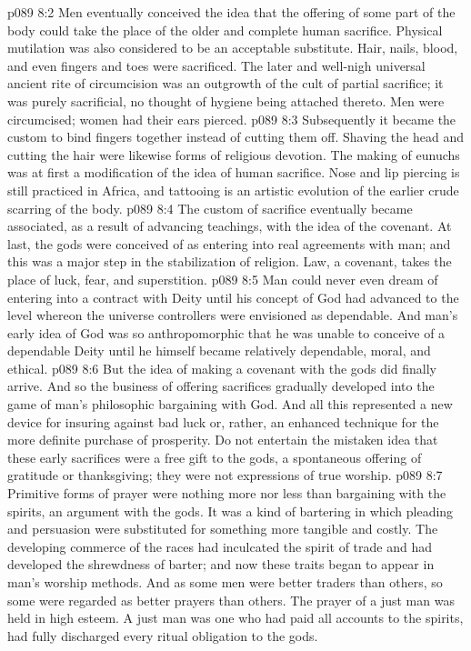 \vs p089 8:2 Men eventually conceived the idea that the offering of some part of the body could take the place of the older and complete human sacrifice. Physical mutilation was also considered to be an acceptable substitute. Hair, nails, blood, and even fingers and toes were sacrificed. The later and well\hyp{}nigh universal ancient rite of circumcision was an outgrowth of the cult of partial sacrifice; it was purely sacrificial, no thought of hygiene being attached thereto. Men were circumcised; women had their ears pierced.
\vs p089 8:3 Subsequently it became the custom to bind fingers together instead of cutting them off. Shaving the head and cutting the hair were likewise forms of religious devotion. The making of eunuchs was at first a modification of the idea of human sacrifice. Nose and lip piercing is still practiced in Africa, and tattooing is an artistic evolution of the earlier crude scarring of the body.
\vs p089 8:4 \pc The custom of sacrifice eventually became associated, as a result of advancing teachings, with the idea of the covenant. At last, the gods were conceived of as entering into real agreements with man; and this was a major step in the stabilization of religion. Law, a covenant, takes the place of luck, fear, and superstition.
\vs p089 8:5 Man could never even dream of entering into a contract with Deity until his concept of God had advanced to the level whereon the universe controllers were envisioned as dependable. And man’s early idea of God was so anthropomorphic that he was unable to conceive of a dependable Deity until he himself became relatively dependable, moral, and ethical.
\vs p089 8:6 But the idea of making a covenant with the gods did finally arrive.  And so the business of offering sacrifices gradually developed into the game of man’s philosophic bargaining with God. And all this represented a new device for insuring against bad luck or, rather, an enhanced technique for the more definite purchase of prosperity. Do not entertain the mistaken idea that these early sacrifices were a free gift to the gods, a spontaneous offering of gratitude or thanksgiving; they were not expressions of true worship.
\vs p089 8:7 \pc Primitive forms of prayer were nothing more nor less than bargaining with the spirits, an argument with the gods. It was a kind of bartering in which pleading and persuasion were substituted for something more tangible and costly. The developing commerce of the races had inculcated the spirit of trade and had developed the shrewdness of barter; and now these traits began to appear in man’s worship methods. And as some men were better traders than others, so some were regarded as better prayers than others. The prayer of a just man was held in high esteem. A just man was one who had paid all accounts to the spirits, had fully discharged every ritual obligation to the gods.
